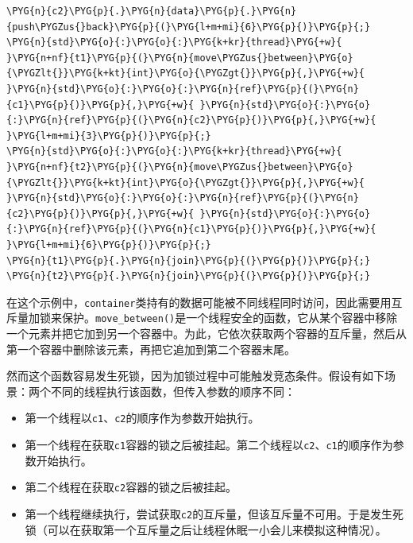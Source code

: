 \begin{codeblockbg}
\begin{Verbatim}[commandchars=\\\{\},breaklines=true,breakanywhere=true,fontsize=\codefont,xleftmargin=17bp]
\PYG{n}{c2}\PYG{p}{.}\PYG{n}{data}\PYG{p}{.}\PYG{n}{push\PYGZus{}back}\PYG{p}{(}\PYG{l+m+mi}{6}\PYG{p}{)}\PYG{p}{;}
\PYG{n}{std}\PYG{o}{:}\PYG{o}{:}\PYG{k+kr}{thread}\PYG{+w}{ }\PYG{n+nf}{t1}\PYG{p}{(}\PYG{n}{move\PYGZus{}between}\PYG{o}{\PYGZlt{}}\PYG{k+kt}{int}\PYG{o}{\PYGZgt{}}\PYG{p}{,}\PYG{+w}{ }\PYG{n}{std}\PYG{o}{:}\PYG{o}{:}\PYG{n}{ref}\PYG{p}{(}\PYG{n}{c1}\PYG{p}{)}\PYG{p}{,}\PYG{+w}{ }\PYG{n}{std}\PYG{o}{:}\PYG{o}{:}\PYG{n}{ref}\PYG{p}{(}\PYG{n}{c2}\PYG{p}{)}\PYG{p}{,}\PYG{+w}{ }\PYG{l+m+mi}{3}\PYG{p}{)}\PYG{p}{;}
\PYG{n}{std}\PYG{o}{:}\PYG{o}{:}\PYG{k+kr}{thread}\PYG{+w}{ }\PYG{n+nf}{t2}\PYG{p}{(}\PYG{n}{move\PYGZus{}between}\PYG{o}{\PYGZlt{}}\PYG{k+kt}{int}\PYG{o}{\PYGZgt{}}\PYG{p}{,}\PYG{+w}{ }\PYG{n}{std}\PYG{o}{:}\PYG{o}{:}\PYG{n}{ref}\PYG{p}{(}\PYG{n}{c2}\PYG{p}{)}\PYG{p}{,}\PYG{+w}{ }\PYG{n}{std}\PYG{o}{:}\PYG{o}{:}\PYG{n}{ref}\PYG{p}{(}\PYG{n}{c1}\PYG{p}{)}\PYG{p}{,}\PYG{+w}{ }\PYG{l+m+mi}{6}\PYG{p}{)}\PYG{p}{;}
\PYG{n}{t1}\PYG{p}{.}\PYG{n}{join}\PYG{p}{(}\PYG{p}{)}\PYG{p}{;}
\PYG{n}{t2}\PYG{p}{.}\PYG{n}{join}\PYG{p}{(}\PYG{p}{)}\PYG{p}{;}
\end{Verbatim}
\end{codeblockbg}



在这个示例中，\texttt{container}类持有的数据可能被不同线程同时访问，因此需要用互斥量加锁来保护。\texttt{move\_\allowbreak{}between()}是一个线程安全的函数，它从某个容器中移除一个元素并把它加到另一个容器中。为此，它依次获取两个容器的互斥量，然后从第一个容器中删除该元素，再把它追加到第二个容器末尾。



然而这个函数容易发生死锁，因为加锁过程中可能触发竞态条件。假设有如下场景：两个不同的线程执行该函数，但传入参数的顺序不同：



\begin{itemize}
\item 第一个线程以\texttt{c1}、\texttt{c2}的顺序作为参数开始执行。



\item 第一个线程在获取\texttt{c1}容器的锁之后被挂起。第二个线程以\texttt{c2}、\texttt{c1}的顺序作为参数开始执行。



\item 第二个线程在获取\texttt{c2}容器的锁之后被挂起。



\item 第一个线程继续执行，尝试获取\texttt{c2}的互斥量，但该互斥量不可用。于是发生死锁（可以在获取第一个互斥量之后让线程休眠一小会儿来模拟这种情况）。

\end{itemize}


